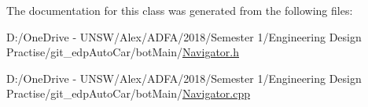 The documentation for this class was generated from the following files\+:\begin{DoxyCompactItemize}
\item 
D\+:/\+One\+Drive -\/ U\+N\+S\+W/\+Alex/\+A\+D\+F\+A/2018/\+Semester 1/\+Engineering Design Practise/git\+\_\+edp\+Auto\+Car/bot\+Main/\mbox{\hyperlink{_navigator_8h}{Navigator.\+h}}\item 
D\+:/\+One\+Drive -\/ U\+N\+S\+W/\+Alex/\+A\+D\+F\+A/2018/\+Semester 1/\+Engineering Design Practise/git\+\_\+edp\+Auto\+Car/bot\+Main/\mbox{\hyperlink{_navigator_8cpp}{Navigator.\+cpp}}\end{DoxyCompactItemize}
